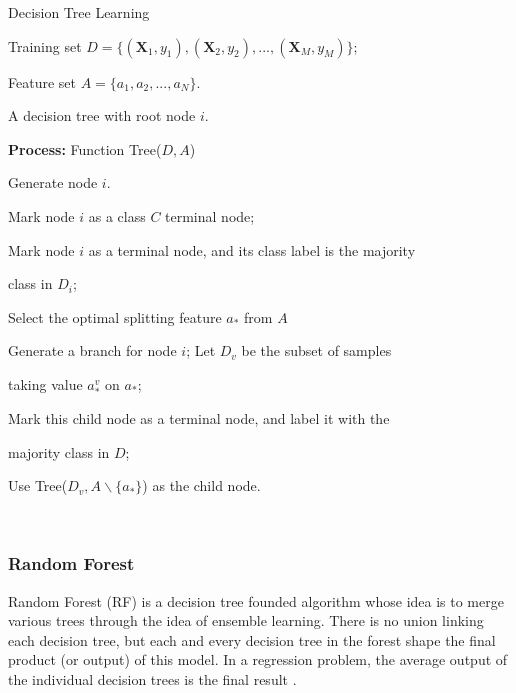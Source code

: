 \begin{algorithm}[H]
\caption{Decision Tree Learning}
\begin{algorithmic}[1]
    \Require Training set $D = \{ (\textbf{X}_1, y_1), (\textbf{X}_2, y_2), . . . , (\textbf{X}_M, y_M)\}$;
    
    Feature set $A = \{a_1, a_2,..., a_N\}$.
    
    
    
    \Ensure A decision tree with root node $i$.
    
    \hspace{-1.5cm}\textbf{Process:} Function Tree($D, A$)
    
    \State Generate node $i$.
    
    \State Mark node $i$ as a class $C$ terminal node; {\Return}
    \EndIf
    
    \State Mark node $i$ as a terminal node, and its class label is the majority 
    
    class in $D_i$; {\Return}
    \EndIf
    
    \State Select the optimal splitting feature $a_*$ from $A$
    
    
    \State Generate a branch for node $i$; Let $D_v$ be the subset of samples
    
    taking value $a_*^v$ on $a_*$;
    
    
    \State Mark this child node as a terminal node, and label it with the 
    
    \hspace{0.65cm}majority class in $D$; {\Return}
    \Else
    
    \State Use Tree($D_v , A \backslash \{a_*\}$) as the child node.
    
    \EndIf
    \EndFor
    
\end{algorithmic}
\end{algorithm}
\hspace{14cm}\cite{Zhou21a}\\






\subsubsection{Random Forest}
Random Forest (RF) is a decision tree founded algorithm whose idea is to merge various trees
through the idea of ensemble learning. There is no union linking each decision tree, but each and every decision tree in the forest shape the
final product (or output) of this model. 
In a regression problem, the average output of the individual decision trees is the final result \cite{YUAN2022100026}.\\

